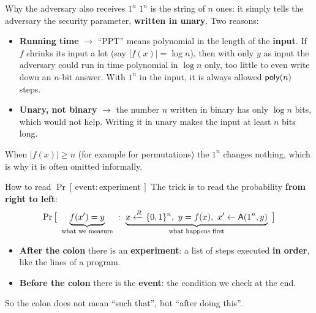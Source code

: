 \begin{framedobs}{Why the adversary also receives $1^n$}
  $1^n$ is the string of $n$ ones: it simply tells the adversary the security parameter, \textbf{written in unary}. Two reasons:
  \begin{itemize}
    \item \textbf{Running time} $\to$ ``PPT'' means polynomial in the length of the \textbf{input}. If $f$ shrinks its input a lot (say $|f(x)| = \log n$), then with only $y$ as input the adversary could run in time polynomial in $\log n$ only, too little to even write down an $n$-bit answer. With $1^n$ in the input, it is always allowed $\mathsf{poly}(n)$ steps.
    \item \textbf{Unary, not binary} $\to$ the number $n$ written in binary has only $\log n$ bits, which would not help. Writing it in unary makes the input at least $n$ bits long.
  \end{itemize}
  When $|f(x)| \geq n$ (for example for permutations) the $1^n$ changes nothing, which is why it is often omitted informally.
\end{framedobs}

\begin{framedobs}{How to read $\Pr[\,\text{event} : \text{experiment}\,]$}
  The trick is to read the probability \textbf{from right to left}:
  \[
    \Pr\big[\ \underbrace{f(x') = y}_{\text{what we measure}}\ :\ \underbrace{x \sample \{0,1\}^n,\ y = f(x),\ x' \leftarrow \Adv(1^n, y)}_{\text{what happens first}}\ \big]
  \]
  \begin{itemize}
    \item \textbf{After the colon} there is an \textbf{experiment}: a list of steps executed \textbf{in order}, like the lines of a program.
    \item \textbf{Before the colon} there is the \textbf{event}: the condition we check at the end.
  \end{itemize}
  So the colon does not mean ``such that'', but ``after doing this''.
\end{framedobs}

